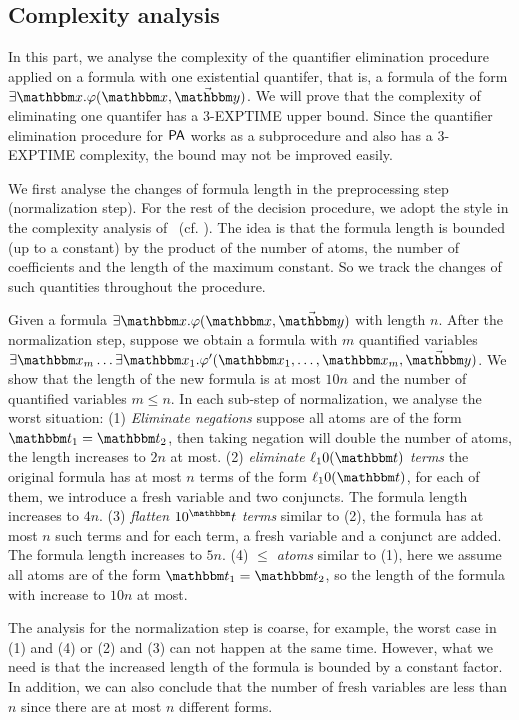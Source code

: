 \subsection{Complexity analysis}\label{app:cpx}

In this part, we analyse the complexity of the quantifier elimination procedure applied on a formula with one existential quantifer, that is, a formula of the form $\exists \ivarx. \varphi(\ivarx, \vec{\ivary})$. We will prove that the complexity of eliminating one quantifer has a 3-EXPTIME upper bound. Since the quantifier elimination procedure for ${\sf PA}$ works as a subprocedure and also has a 3-EXPTIME complexity, the bound may not be improved easily.


We first analyse the changes of formula length in the preprocessing step (normalization step). For the rest of the decision procedure, we adopt the style in the complexity analysis of \pa \ (cf. \cite{Oppen73}). The idea is that the formula length is bounded (up to a constant) by the product of the number of atoms, the number of coefficients and the length of the maximum constant. So we track the changes of such quantities throughout the procedure.

Given a formula $\exists \ivarx. \varphi(\ivarx, \vec{\ivary})$ with length $n$. After the normalization step, suppose we obtain a formula with $m$ quantified variables $\exists \ivarx_m \dots\exists \ivarx_1. \varphi'(\ivarx_1,\dots, \ivarx_m, \vec{\ivary})$. We show that the length of the new formula is at most $10n$ and the number of quantified variables $m\le n$. In each sub-step of normalization, we analyse the worst situation: (1) \textit{Eliminate negations} suppose all atoms are of the form $\iterm_1=\iterm_2$, then taking negation will double the number of atoms, the length increases to $2n$ at most. (2) \textit{eliminate $\ell_10(\iterm)$ terms} the original formula has at most $n$ terms of the form $\ell_10(\iterm)$, for each of them, we introduce a fresh variable and two conjuncts. The formula length increases to $4n$.
(3) \textit{flatten $10^\iterm$ terms} similar to (2), the formula has at most $n$ such terms and for each term, a fresh variable and a conjunct are added. The formula length increases to $5n$. (4) \textit{$\le$ atoms} similar to (1), here we assume all atoms are of the form $\iterm_1  = \iterm_2$, so the length of the formula with increase to $10n$ at most. 

The analysis for the normalization step is coarse, for example, the worst case in (1) and (4) or (2) and (3) can not happen at the same time. However, what we need is that the increased length of the formula is bounded by a constant factor. In addition, we can also conclude that the number of fresh variables are less than $n$ since there are at most $n$ different forms. 

